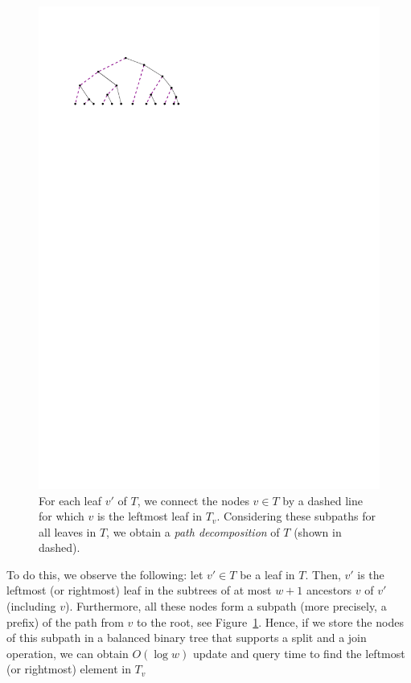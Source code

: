 \documentclass[a4paper,11pt]{article}
\newcommand{\?}{\mskip1.5mu}
\begin{document}
\begin{figure}
\centering
\includegraphics{pathdecomp}
\caption{For each leaf $v'$ of $T$, we connect the nodes
$v \in T$ by a dashed line for which $v$ is the leftmost leaf in $T_v$.
Considering these
subpaths for all leaves in $T$, we obtain a \emph{path decomposition}
of $T$ (shown in dashed).}
\label{fig:pathdecomp}
\end{figure}
To do this, we observe the following: let $v' \in T$ be 
a leaf in $T$. Then, $v'$ is the leftmost (or rightmost)
leaf in the subtrees of at most $w + 1$ ancestors $v$ of $v'$ (including $v$).
Furthermore, all these nodes form a subpath (more precisely,
a prefix) of the path from $v$ to the root, see Figure~\ref{fig:pathdecomp}.
Hence, if we store the nodes of 
this subpath in a balanced binary tree that supports a split
and a join operation,
we can obtain $O(\log w)$ update and query time
to find the leftmost (or rightmost) element in $T_v$
\end{document}

